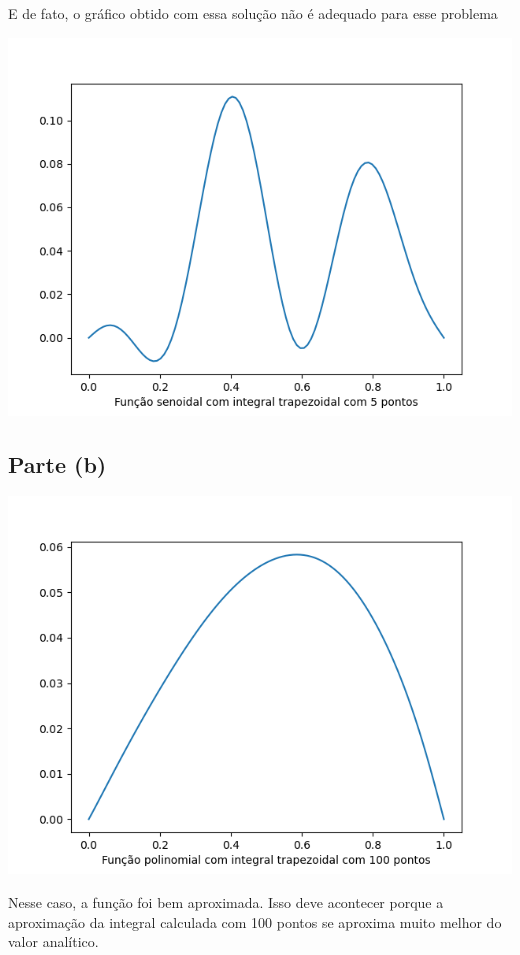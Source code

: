\documentclass{article}
\begin{document}
E de fato, o gráfico obtido com essa solução não é adequado para esse problema
\begin{center}
    \includegraphics[width=1\textwidth]{exercicio6_seno.png}
\end{center}

\subsection{Parte (b)}
\begin{center}
    \includegraphics[width=1\textwidth]{exercicio6_polinomio.png}
\end{center}

Nesse caso, a função foi bem aproximada. Isso deve acontecer porque a aproximação da integral calculada com 100 pontos se aproxima muito melhor do valor analítico.
\end{document}
